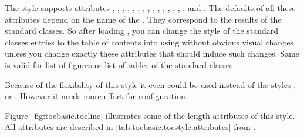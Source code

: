 \begin{description}
  The style supports attributes , ,
  , , ,
  , , ,
  , , ,
  , ,
  , , and
  . The defaults of all these attributes depend on
  the name of the . They correspond to the results of the
  standard classes. So after loading , you can change the
  style of the standard classes entries to the table of contents into
   using  without obvious visual
  changes unless you change exactly these attributes that should induce such
  changes. Same is valid for list of figures or list of tables of the standard
  classes.

  Because of the flexibility of this style it even could be used instead of
  the styles ,  or
  . However it needs more effort for configuration.

  {Figure~\ref*{fig:tocbasic.tocline}} illustrates some of the length
  attributes of this style. All attributes are described in
  \autoref{tab:tocbasic.tocstyle.attributes} from
  .
  \begin{figure}
    \centering
\end{figure}
\end{description}
